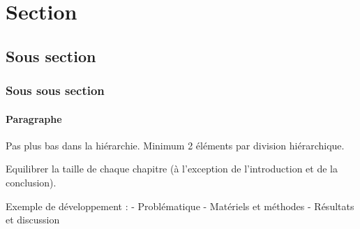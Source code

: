 \section{Section}

\subsection{Sous section}

\subsubsection{Sous sous section}

\paragraph{Paragraphe}

Pas plus bas dans la hiérarchie. Minimum 2 éléments par division hiérarchique.

Equilibrer la taille de chaque chapitre (à l'exception de l'introduction et de la conclusion).

Exemple de développement :
- Problématique
- Matériels et méthodes
- Résultats et discussion



